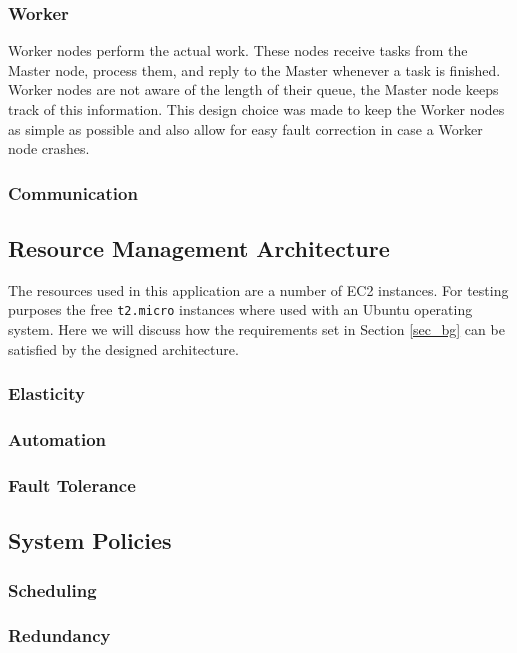 \documentclass{acm_proc_article-sp}
\begin{document}
\subsubsection{Worker}
Worker nodes perform the actual work.
These nodes receive tasks from the Master node, process them, and reply to the Master whenever a task is finished.
Worker nodes are not aware of the length of their queue, the Master node keeps track of this information.
This design choice was made to keep the Worker nodes as simple as possible and also allow for easy fault correction in case a Worker node crashes.

\subsubsection{Communication}

\subsection{Resource Management Architecture}
The resources used in this application are a number of EC2 instances.
For testing purposes the free \texttt{t2.micro} instances where used with an Ubuntu operating system.
Here we will discuss how the requirements set in Section \ref{sec_bg} can be satisfied by the designed architecture.

\subsubsection{Elasticity}

\subsubsection{Automation}

\subsubsection{Fault Tolerance}

\subsection{System Policies}

\subsubsection{Scheduling}

\subsubsection{Redundancy}
\end{document}
